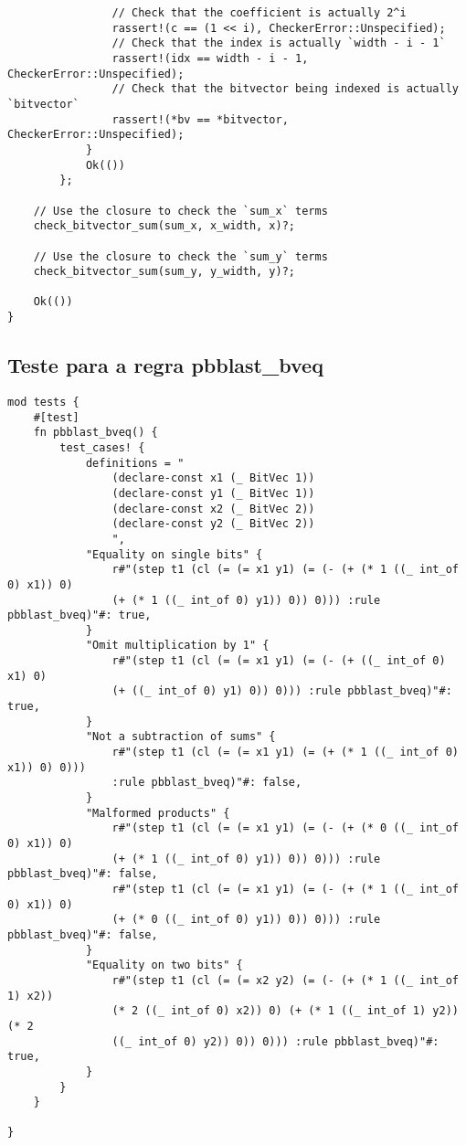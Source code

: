 \documentclass[conference]{IEEEtran}
\begin{document}
\begin{verbatim}
                // Check that the coefficient is actually 2^i
                rassert!(c == (1 << i), CheckerError::Unspecified);
                // Check that the index is actually `width - i - 1`
                rassert!(idx == width - i - 1, CheckerError::Unspecified);
                // Check that the bitvector being indexed is actually `bitvector`
                rassert!(*bv == *bitvector, CheckerError::Unspecified);
            }
            Ok(())
        };

    // Use the closure to check the `sum_x` terms
    check_bitvector_sum(sum_x, x_width, x)?;

    // Use the closure to check the `sum_y` terms
    check_bitvector_sum(sum_y, y_width, y)?;

    Ok(())
}
\end{verbatim}

\subsection{Teste para a regra pbblast\_bveq}
\begin{verbatim}
mod tests {
    #[test]
    fn pbblast_bveq() {
        test_cases! {
            definitions = "
                (declare-const x1 (_ BitVec 1))
                (declare-const y1 (_ BitVec 1))
                (declare-const x2 (_ BitVec 2))
                (declare-const y2 (_ BitVec 2))
                ",
            "Equality on single bits" {
                r#"(step t1 (cl (= (= x1 y1) (= (- (+ (* 1 ((_ int_of 0) x1)) 0)
                (+ (* 1 ((_ int_of 0) y1)) 0)) 0))) :rule pbblast_bveq)"#: true,
            }
            "Omit multiplication by 1" {
                r#"(step t1 (cl (= (= x1 y1) (= (- (+ ((_ int_of 0) x1) 0)
                (+ ((_ int_of 0) y1) 0)) 0))) :rule pbblast_bveq)"#: true,
            }
            "Not a subtraction of sums" {
                r#"(step t1 (cl (= (= x1 y1) (= (+ (* 1 ((_ int_of 0) x1)) 0) 0)))
                :rule pbblast_bveq)"#: false,
            }
            "Malformed products" {
                r#"(step t1 (cl (= (= x1 y1) (= (- (+ (* 0 ((_ int_of 0) x1)) 0)
                (+ (* 1 ((_ int_of 0) y1)) 0)) 0))) :rule pbblast_bveq)"#: false,
                r#"(step t1 (cl (= (= x1 y1) (= (- (+ (* 1 ((_ int_of 0) x1)) 0)
                (+ (* 0 ((_ int_of 0) y1)) 0)) 0))) :rule pbblast_bveq)"#: false,
            }
            "Equality on two bits" {
                r#"(step t1 (cl (= (= x2 y2) (= (- (+ (* 1 ((_ int_of 1) x2))
                (* 2 ((_ int_of 0) x2)) 0) (+ (* 1 ((_ int_of 1) y2)) (* 2
                ((_ int_of 0) y2)) 0)) 0))) :rule pbblast_bveq)"#: true,
            }
        }
    }
 
}
\end{verbatim}
\end{document}
